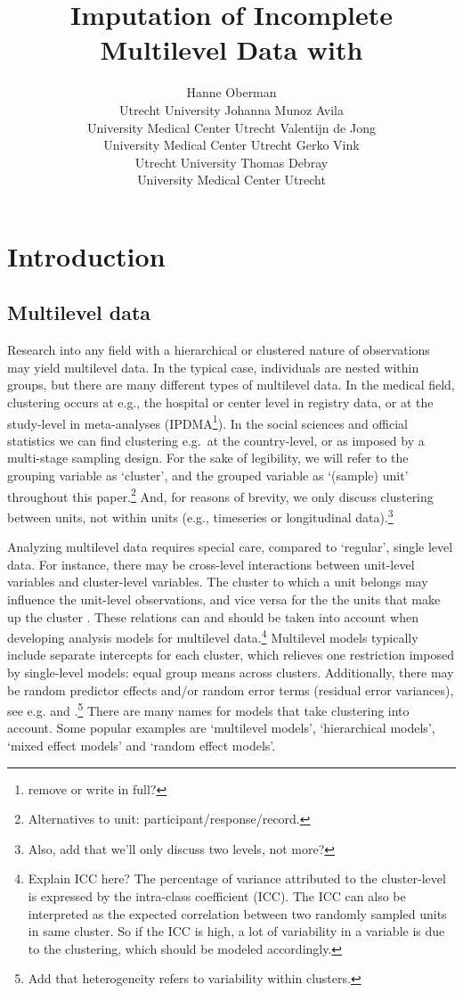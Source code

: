 \documentclass[
]{jss}
\author{
Hanne Oberman\\Utrecht University \And Johanna Munoz Avila\\University
Medical Center Utrecht \AND Valentijn de Jong\\University Medical
Center Utrecht \And Gerko Vink\\Utrecht University \AND Thomas
Debray\\University Medical Center Utrecht
}
\title{Imputation of Incomplete Multilevel Data with \pkg{mice}}
\begin{document}
\hypertarget{introduction}{%
\section{Introduction}\label{introduction}}

\hypertarget{multilevel-data}{%
\subsection{Multilevel data}\label{multilevel-data}}

Research into any field with a hierarchical or clustered nature of
observations may yield multilevel data. In the typical case, individuals
are nested within groups, but there are many different types of
multilevel data. In the medical field, clustering occurs at e.g., the
hospital or center level in registry data, or at the study-level in
meta-analyses (IPDMA\footnote{remove or write in full?}). In the social
sciences and official statistics we can find clustering e.g.~at the
country-level, or as imposed by a multi-stage sampling design. For the
sake of legibility, we will refer to the grouping variable as `cluster',
and the grouped variable as `(sample) unit' throughout this
paper.\footnote{Alternatives to unit: participant/response/record.} And,
for reasons of brevity, we only discuss clustering between units, not
within units (e.g., timeseries or longitudinal data).\footnote{Also, add
  that we'll only discuss two levels, not more?}

Analyzing multilevel data requires special care, compared to `regular',
single level data. For instance, there may be cross-level interactions
between unit-level variables and cluster-level variables. The cluster to
which a unit belongs may influence the unit-level observations, and vice
versa for the the units that make up the cluster \citep{hox17}. These
relations can and should be taken into account when developing analysis
models for multilevel data.\footnote{Explain ICC here? The percentage of
  variance attributed to the cluster-level is expressed by the
  intra-class coefficient (ICC). The ICC can also be interpreted as the
  expected correlation between two randomly sampled units in same
  cluster. So if the ICC is high, a lot of variability in a variable is
  due to the clustering, which should be modeled accordingly.}
Multilevel models typically include separate intercepts for each
cluster, which relieves one restriction imposed by single-level models:
equal group means across clusters. Additionally, there may be random
predictor effects and/or random error terms (residual error variances),
see e.g. \citet{hox17} and \citet{jong21}.\footnote{Add that
  heterogeneity refers to variability within clusters.} There are many
names for models that take clustering into account. Some popular
examples are `multilevel models', `hierarchical models', `mixed effect
models' and `random effect models'.
\end{document}
